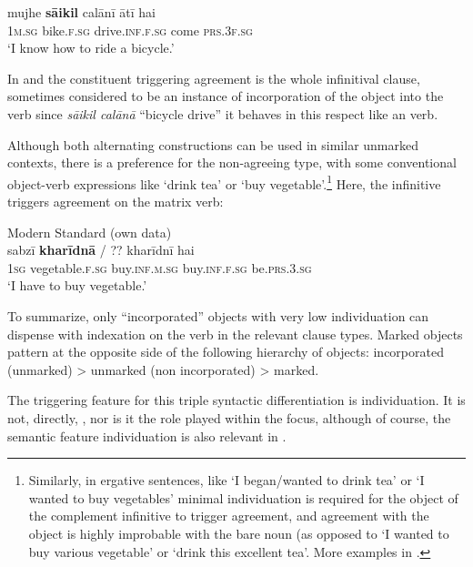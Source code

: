 \documentclass[output=paper]{LSP/langsci}
\begin{document}
\ex\label{10-mo-ex:26b}
\gll mujhe \textbf{sāikil} calānī ātī hai\\
 \textsc{1m.sg} bike.\textsc{f.sg} drive.\textsc{inf.f.sg} come \textsc{prs.3f.sg}\\
\glt ‘I know how to ride a bicycle.’
\z
\z

In  and  the constituent triggering agreement is the whole infinitival clause, sometimes considered to be an instance of incorporation of the object into the verb since \textit{sāikil calānā} “bicycle drive” it behaves in this respect like an  verb. 

Although both alternating constructions can be used in similar unmarked contexts, there is a preference for the non-agreeing type, with some conventional object-verb expressions like ‘drink tea’ or ‘buy vegetable’.\footnote{Similarly, in ergative sentences, like ‘I began/wanted to drink tea’ or ‘I wanted to buy vegetables’ minimal individuation is required for the object of the complement infinitive to trigger agreement, and agreement with the object is highly improbable with the bare noun (as opposed to ‘I wanted to buy various vegetable’ or ‘drink this excellent tea’. More examples in \citet{Montaut2012Saillance}.} Here, the infinitive triggers agreement on the matrix verb:

\ea Modern Standard   (own data)\\
\label{10-mo-ex:27}
 sabzī \textbf{kharīdnā} / ?? kharīdnī hai\\
\textsc{1sg} vegetable.\textsc{f.sg} buy.\textsc{inf.m.sg} { } { } buy.\textsc{inf.f.sg} be.\textsc{prs.3.sg}\\
\glt ‘I have to buy vegetable.’
\z

To summarize, only “incorporated” objects with very low individuation can dispense with indexation on the verb in the relevant clause types. Marked objects pattern at the opposite side of the following hierarchy of objects: incorporated (unmarked) > unmarked (non incorporated) > marked.

The triggering feature for this triple syntactic differentiation is individuation. It is not, directly, , nor is it the role played within the focus, although of course, the semantic feature individuation is also relevant in .
\end{document}

